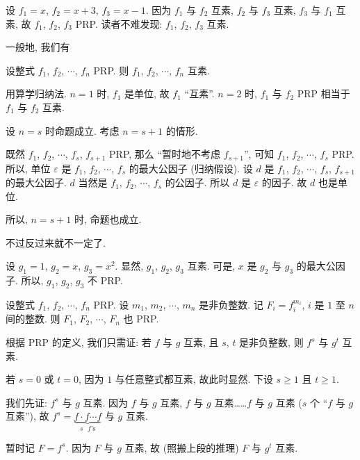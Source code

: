 \begin{example}
    设 $f_1 = x$, $f_2 = x + 3$, $f_3 = x - 1$. 因为 $f_1$ 与 $f_2$ 互素, $f_2$ 与 $f_3$ 互素, $f_3$ 与 $f_1$ 互素, 故 $f_1$, $f_2$, $f_3$ PRP. 读者不难发现: $f_1$, $f_2$, $f_3$ 互素.
\end{example}

一般地, 我们有
\begin{proposition}
    设整式 $f_1$, $f_2$, $\cdots$, $f_n$ PRP. 则 $f_1$, $f_2$, $\cdots$, $f_n$ 互素.
\end{proposition}

\begin{pf}
    用算学归纳法. $n = 1$ 时, $f_1$ 是单位, 故 $f_1$ ``互素''. $n = 2$ 时, $f_1$ 与 $f_2$ PRP 相当于 $f_1$ 与 $f_2$ 互素.

    设 $n = s$ 时命题成立. 考虑 $n = s + 1$ 的情形.

    既然 $f_1$, $f_2$, $\cdots$, $f_s$, $f_{s+1}$ PRP, 那么 ``暂时地不考虑 $f_{s+1}$'', 可知 $f_1$, $f_2$, $\cdots$, $f_s$ PRP. 所以, 单位 $\varepsilon$ 是 $f_1$, $f_2$, $\cdots$, $f_s$ 的最大公因子 (归纳假设). 设 $d$ 是 $f_1$, $f_2$, $\cdots$, $f_s$, $f_{s+1}$ 的最大公因子. $d$ 当然是 $f_1$, $f_2$, $\cdots$, $f_s$ 的公因子. 所以 $d$ 是 $\varepsilon$ 的因子. 故 $d$ 也是单位.

    所以, $n = s + 1$ 时, 命题也成立.
\end{pf}

不过反过来就不一定了.

\begin{example}
    设 $g_1 = 1$, $g_2 = x$, $g_3 = x^2$. 显然, $g_1$, $g_2$, $g_3$ 互素. 可是, $x$ 是 $g_2$ 与 $g_3$ 的最大公因子. 所以, $g_1$, $g_2$, $g_3$ 不 PRP.
\end{example}

\begin{proposition}
    设整式 $f_1$, $f_2$, $\cdots$, $f_n$ PRP. 设 $m_1$, $m_2$, $\cdots$, $m_n$ 是非负整数. 记 $F_i = f_i^{m_i}$, $i$ 是 $1$ 至 $n$ 间的整数. 则 $F_1$, $F_2$, $\cdots$, $F_n$ 也 PRP.
\end{proposition}

\begin{pf}
    根据 PRP 的定义, 我们只需证: 若 $f$ 与 $g$ 互素, 且 $s$, $t$ 是非负整数, 则 $f^s$ 与 $g^t$ 互素.

    若 $s = 0$ 或 $t = 0$, 因为 $1$ 与任意整式都互素, 故此时显然. 下设 $s \geq 1$ 且 $t \geq 1$.

    我们先证: $f^s$ 与 $g$ 互素. 因为 $f$ 与 $g$ 互素, $f$ 与 $g$ 互素……$f$ 与 $g$ 互素 ($s$ 个 ``$f$ 与 $g$ 互素''), 故 $f^s = \underbrace{f \cdot f \cdots f}_{\text{$s$ $f$'s}}$ 与 $g$ 互素.

    暂时记 $F = f^s$. 因为 $F$ 与 $g$ 互素, 故 (照搬上段的推理) $F$ 与 $g^t$ 互素.
\end{pf}

